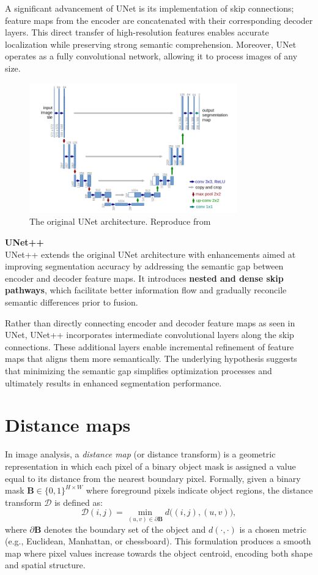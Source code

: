 \documentclass[target=bach,aauheader=,style=]{thud}
\begin{document}
A significant advancement of UNet is its implementation of skip connections; feature maps from the encoder are concatenated with their corresponding decoder layers. This direct transfer of high-resolution features enables accurate localization while preserving strong semantic comprehension. Moreover, UNet operates as a fully convolutional network, allowing it to process images of any size.
\begin{figure}[H]
  \centering
  \includegraphics[width=0.8\textwidth]{imgs/unet.jpg}
  \caption{The original UNet architecture. Reproduce from \cite{DBLP:journals/corr/RonnebergerFB15}}
  \label{fig:unet}
\end{figure}
\noindent\textbf{UNet++}\\

\noindent UNet++ \cite{DBLP:journals/corr/abs-1807-10165} extends the original UNet architecture with enhancements aimed at improving segmentation accuracy by addressing the semantic gap between encoder and decoder feature maps. It introduces \textbf{nested and dense skip pathways}, which facilitate better information flow and gradually reconcile semantic differences prior to fusion.

Rather than directly connecting encoder and decoder feature maps as seen in UNet, UNet++ incorporates intermediate convolutional layers along the skip connections. These additional layers enable incremental refinement of feature maps that aligns them more semantically. The underlying hypothesis suggests that minimizing the semantic gap simplifies optimization processes and ultimately results in enhanced segmentation performance.
\section{Distance maps}
In image analysis, a \emph{distance map} (or distance transform) is a geometric representation in which each pixel of a binary object mask is assigned a value equal to its distance from the nearest boundary pixel. 
Formally, given a binary mask $\mathbf{B}\in\{0,1\}^{H\times W}$ where foreground pixels indicate object regions, the distance transform $\mathcal{D}$ is defined as:
\[
\mathcal{D}(i,j) = \min_{(u,v)\in \partial \mathbf{B}} d\big((i,j),(u,v)\big),
\]
where $\partial \mathbf{B}$ denotes the boundary set of the object and $d(\cdot,\cdot)$ is a chosen metric (e.g., Euclidean, Manhattan, or chessboard). 
This formulation produces a smooth map where pixel values increase towards the object centroid, encoding both shape and spatial structure.
\end{document}
